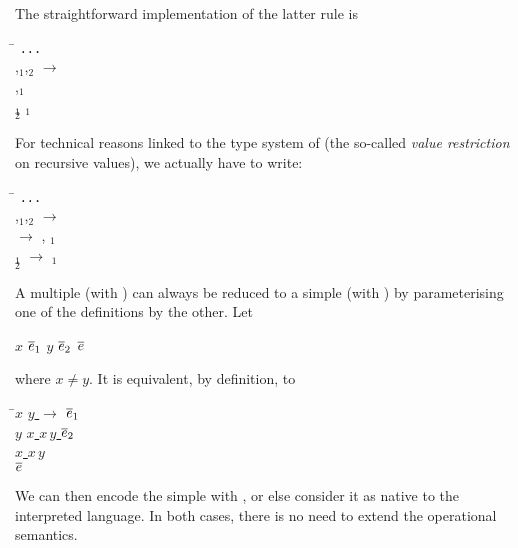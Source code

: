 The straightforward implementation of the latter rule is
\begin{tabbing}
 \Xlet \= \Xrec {}   \equal
 \Xmatch {} \Xwith \texttt{...} \\ 
 \vbar \>  \lpar{},$_1$,$_2$\rpar{}
 $\rightarrow$\\
 \> \quad \Xlet \Xrec {} \equal {} 
 \lpar{},$_1$\rpar{} \\
 \> \quad \Xand {}$_1$ \equal {}  $_1$\\
 \> \quad \Xin {}  $_2$
\end{tabbing}
\noindent For technical reasons linked to the type system of \OCaml
(the so\hyp{}called \emph{value restriction} on recursive values), we
actually have to write:
\begin{tabbing}
 \Xlet \= \Xrec {}   \equal
 \Xmatch {} \Xwith \texttt{...} \\ 
 \vbar \> 
 \lpar{},$_1$,$_2$\rpar{} $\rightarrow$\\
 \> \quad \Xlet \Xrec {} \equal \underline{\Xfun
  $\rightarrow$}  
 \lpar{}, $_1$\underline{\lpar\rpar}\rpar{}  \underline{}\\
 \> \quad \Xand {}$_1$ \equal \underline{\Xfun \lpar\rpar{}
 $\rightarrow$}   $_1$\\
 \> \quad \Xin {}  $_2$
\end{tabbing}
A multiple \Xlet \Xrec (with \Xand) can always be reduced to
a simple \Xlet \Xrec (with \Xin) by parameterising one of the
definitions by the other. Let
\begin{center}
\Xlet \Xrec $x$ \equal $\overline{e}_1$ \Xand $y$ \equal $\overline{e}_2$ \Xin
$\overline{e}$
\end{center}
where $x \neq y$. It is equivalent, by definition, to
\begin{tabbing}
\Xlet \= \Xrec $x$ \equal \underline{\Xfun $y$
  $\rightarrow$} $\overline{e}_1$ \Xin\\
\> \Xlet \Xrec $y$ \equal \underline{\Xlet $x$ \equal $x \, y$
  \Xin} $\overline{e}_2$ \Xin\\
\> \underline{\Xlet $x$ \equal $x \, y$}\\
\underline{\Xin} $\overline{e}$
\end{tabbing}
We can then encode the simple \Xlet \Xrec with , or else
consider it as native to the interpreted language. In both cases,
there is no need to extend the operational semantics.

